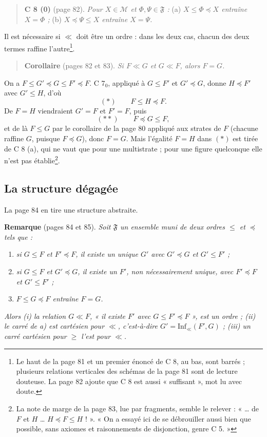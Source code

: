 \documentclass[11pt,a4paper]{article}
\begin{document}
\begin{quote}
\textbf{C 8 (0)} (page 82). \emph{Pour $X \in \mathcal{M}$ et $\Phi, \Psi \in
\mathfrak{F}$ :} (a) \emph{$X \leq \Phi \preccurlyeq X$ entraîne $X = \Phi$ ;}
(b) \emph{$X \preccurlyeq \Psi \leq X$ entraîne $X = \Psi$.}
\end{quote}

Il est nécessaire si $\ll$ doit être un ordre : dans les deux cas, chacun des
deux termes raffine l'autre\footnote{Le haut de la page 81 et un premier énoncé
de C 8, au bas, sont barrés ; plusieurs relations verticales des schémas de la
page 81 sont de lecture douteuse. La page 82 ajoute que C 8 est aussi
« suffisant », mot lu avec doute.}.

\begin{quote}
\textbf{Corollaire} (pages 82 et 83). \emph{Si $F \ll G$ et $G \ll F$, alors
$F = G$.}
\end{quote}

On a $F \leq G' \preccurlyeq G \leq F' \preccurlyeq F$. C 7$_{0}$, appliqué à
$G \leq F'$ et $G' \preccurlyeq G$, donne $H \preccurlyeq F'$ avec $G' \leq H$,
d'où
\[
(*) \qquad F \leq H \preccurlyeq F .
\]
De $F = H$ viendraient $G' = F$ et $F' = F$, puis
\[
(**) \qquad F \preccurlyeq G \leq F ,
\]
et de là $F \leq G$ par le corollaire de la page 80 appliqué aux strates de $F$
(chacune raffine $G$, puisque $F \preccurlyeq G$), donc $F = G$. Mais
l'égalité $F = H$ dans $(*)$ est tirée de C 8 (a), qui ne vaut que pour une
multistrate ; pour une figure quelconque elle n'est pas
établie\footnote{La note de marge de la page 83, lue par fragments, semble le
relever : « … de $F$ et $H$ … $H \preccurlyeq F \leq H$ ! ». « On a essayé ici
de se débrouiller aussi bien que possible, sans axiomes et raisonnements de
disjonction, genre C 5. »}.

\subsection*{La structure dégagée}

La page 84 en tire une structure abstraite.

\textbf{Remarque} (pages 84 et 85). \emph{Soit $\mathfrak{F}$ un ensemble muni de
deux ordres $\leq$ et $\preccurlyeq$ tels que :}
\begin{enumerate}
\item[a)] \emph{si $G \leq F$ et $F' \preccurlyeq F$, il existe un unique $G'$
avec $G' \preccurlyeq G$ et $G' \leq F'$ ;}
\item[b)] \emph{si $G \leq F$ et $G' \preccurlyeq G$, il existe un $F'$, non
nécessairement unique, avec $F' \preccurlyeq F$ et $G' \leq F'$ ;}
\item[c)] \emph{$F \leq G \preccurlyeq F$ entraîne $F = G$.}
\end{enumerate}
\emph{Alors (i) la relation $G \ll F$, « il existe $F'$ avec $G \leq F'
\preccurlyeq F$ », est un ordre ; (ii) le carré de a) est cartésien pour $\ll$,
c'est-à-dire $G' = \mathrm{Inf}_{\ll}(F', G)$ ; (iii) un carré cartésien pour
$\geq$ l'est pour $\ll$.}
\end{document}
